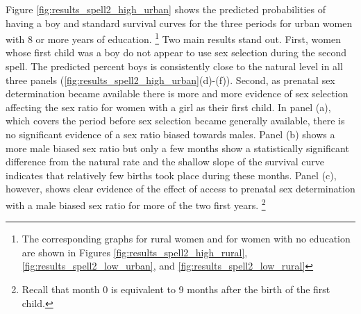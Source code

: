 \documentclass[12pt,letterpaper]{article}
\begin{document}
Figure \ref{fig:results_spell2_high_urban} 
shows the predicted probabilities of having a boy and standard survival curves
for the three periods for urban women with 8 or more years of education.%
\footnote{
The corresponding graphs for rural women and for women with no education are
shown in Figures \ref{fig:results_spell2_high_rural}, \ref{fig:results_spell2_low_urban},
and \ref{fig:results_spell2_low_rural}
}
Two main results stand out.
First, women whose first child was a boy do not appear to use sex selection during
the second spell.
The predicted percent boys is consistently close to the natural level in all three
panels (\ref{fig:results_spell2_high_urban}(d)-(f)).
Second, as prenatal sex determination became available there is more and more
evidence of sex selection affecting the sex ratio for women with a girl as their
first child.
In panel (a), which covers the period before sex selection became generally
available, there is no significant evidence of a sex ratio biased towards males.
Panel (b) shows a more male biased sex ratio but only a few months show
a statistically significant difference from the natural rate and the shallow 
slope of the survival curve indicates that relatively few births took place
during these months.
Panel (c), however, shows clear evidence of the effect of access to prenatal
sex determination with a male biased sex ratio for more of the two first years.%
\footnote{
Recall that month 0 is equivalent to 9 months after the birth
of the first child.
}


\end{document}
